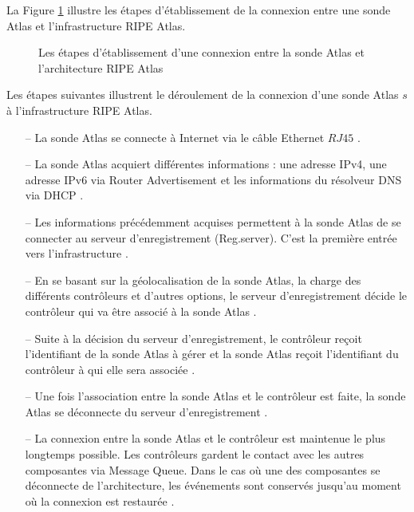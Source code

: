 La Figure \ref{fig:deroulement-connexion-ripe-atlas} illustre les étapes d'établissement de la connexion entre une sonde Atlas  et  l'infrastructure RIPE Atlas.

\begin{figure}[H]
	\captionsetup{justification=centering}
	\centering
	\resizebox{\textwidth}{!}{
		 
	}
	\caption{Les étapes d'établissement d'une connexion entre la sonde Atlas et l'architecture  RIPE Atlas}
	\label{fig:deroulement-connexion-ripe-atlas}
\end{figure}


Les étapes suivantes illustrent le déroulement de la connexion d'une sonde Atlas $s$ à l'infrastructure RIPE Atlas. 

\begin{itemize}
	\item[--] La sonde Atlas se connecte à Internet via  le câble Ethernet $RJ45$ .
	\item[--] La sonde Atlas acquiert différentes informations : une adresse IPv4, une adresse IPv6 via Router Advertisement et les informations du résolveur DNS via DHCP . 
	
	\item[--] Les informations précédemment acquises permettent à la sonde Atlas de se connecter  au serveur d'enregistrement (Reg.server). C'est la première entrée vers l'infrastructure .
	
	\item[--] En se basant sur la géolocalisation de la sonde Atlas, la charge des différents contrôleurs et d'autres options,  le serveur d'enregistrement décide le contrôleur qui va  être associé à la sonde Atlas . 
	
	\item[--] Suite à la décision du serveur d'enregistrement, le contrôleur reçoit l'identifiant de la sonde Atlas à gérer et la sonde Atlas reçoit l'identifiant du contrôleur  à qui elle sera associée .
	
	\item[--]  Une fois l'association entre la sonde Atlas et le contrôleur est faite,  la sonde Atlas se déconnecte du serveur d'enregistrement .
	
	\item[--] La connexion entre la sonde Atlas et le contrôleur est  maintenue le plus longtemps possible. Les contrôleurs gardent le contact avec les autres composantes via Message Queue. Dans le cas où  une des composantes se déconnecte de l'architecture, les événements sont conservés jusqu'au moment où la connexion est restaurée .
	
\end{itemize}


